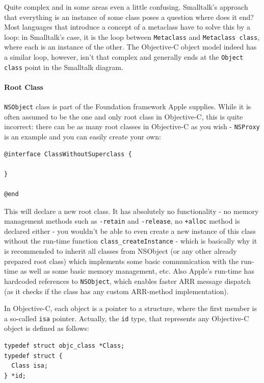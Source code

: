 Quite complex and in some areas even a little confusing. Smalltalk's approach that everything is an instance of some class poses a question where does it end? Most languages that introduce a concept of a metaclass have to solve this by a loop: in Smalltalk's case, it is the loop between \verb=Metaclass= and \verb=Metaclass class=, where each is an instance of the other. The Objective-C object model indeed has a similar loop, however, isn't that complex and generally ends at the \verb=Object class= point in the Smalltalk diagram.

\paragraph{Root Class}
\verb=NSObject= class is part of the Foundation framework Apple supplies. While it is often assumed to be the one and only root class in Objective-C, this is quite incorrect: there can be as many root classes in Objective-C as you wish - \verb=NSProxy= is an example and you can easily create your own:

\begin{verbatim}@interface ClassWithoutSuperclass {
  
}

@end\end{verbatim}

This will declare a new root class. It has absolutely no functionality - no memory management methods such as \verb=-retain= and \verb=-release=, no \verb=+alloc= method is declared either - you wouldn't be able to even create a new instance of this class without the run-time function \verb=class_createInstance= - which is basically why it is recommended to inherit all classes from NSObject (or any other already prepared root class) which implements some basic communication with the run-time as well as some basic memory management, etc. Also Apple's run-time has hardcoded references to \verb=NSObject=, which enables faster ARR message dispatch (as it checks if the class has any custom ARR-method implementation).

In Objective-C, each object is a pointer to a structure, where the first member is a so-called \verb=isa= pointer. Actually, the \verb=id= type, that represents any Objective-C object is defined as follows:

\begin{verbatim}
typedef struct objc_class *Class;
typedef struct {
  Class isa;
} *id;
\end{verbatim}

